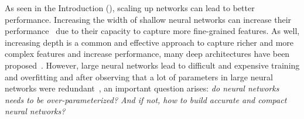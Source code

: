 







As seen in the Introduction (), scaling up networks can lead to better performance.
Increasing the width of shallow neural networks can increase their performance~\cite{howard2017mobilenets,sandler2018mobilenetv2,tan2019mnasnet,zagoruyko2016wide} due to their capacity to capture more fine-grained features.
As well, increasing depth is a common and effective approach to capture richer and more complex features and increase performance, many deep architectures have been proposed~\cite{he2016deep,huang2016deep, szegedy2016rethinking,szegedy2017inception,xiao2018dynamical}.
However, large neural networks lead to difficult and expensive training and overfitting and after observing that a lot of parameters in large neural networks were redundant~\cite{dai2018compressing,frankle2018lottery}, an important question arises: \emph{do neural networks needs to be over-parameterized? And if not, how to build accurate and compact neural networks?} 



